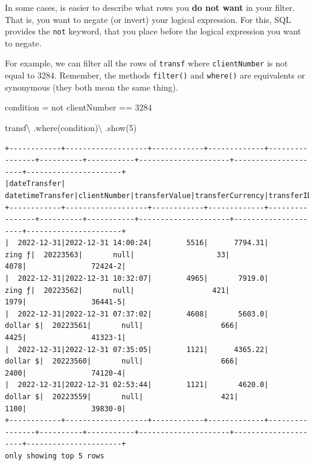 \documentclass[
  11pt,
  letterpaper,
  DIV=11,
  numbers=noendperiod]{scrreprt}
\newenvironment{Shaded}{\begin{snugshade}}{\end{snugshade}}
\newcommand{\DecValTok}[1]{\textcolor[rgb]{0.68,0.00,0.00}{#1}}
\newcommand{\NormalTok}[1]{\textcolor[rgb]{0.00,0.23,0.31}{#1}}
\newcommand{\OperatorTok}[1]{\textcolor[rgb]{0.37,0.37,0.37}{#1}}
\newcommand{\StringTok}[1]{\textcolor[rgb]{0.13,0.47,0.30}{#1}}
\begin{document}
In some cases, is easier to describe what rows you \textbf{do not want}
in your filter. That is, you want to negate (or invert) your logical
expression. For this, SQL provides the \texttt{not} keyword, that you
place before the logical expression you want to negate.

For example, we can filter all the rows of \texttt{transf} where
\texttt{clientNumber} is not equal to 3284. Remember, the methods
\texttt{filter()} and \texttt{where()} are equivalents or synonymous
(they both mean the same thing).

\begin{Shaded}
\begin{Highlighting}[]
\NormalTok{condition }\OperatorTok{=} \StringTok{\textquotesingle{}\textquotesingle{}\textquotesingle{}}
\StringTok{  not clientNumber == 3284}
\StringTok{\textquotesingle{}\textquotesingle{}\textquotesingle{}}

\NormalTok{transf}\OperatorTok{\textbackslash{}}
\NormalTok{  .where(condition)}\OperatorTok{\textbackslash{}}
\NormalTok{  .show(}\DecValTok{5}\NormalTok{)}
\end{Highlighting}
\end{Shaded}

\begin{verbatim}
+------------+-------------------+------------+-------------+----------------+----------+-----------+---------------------+---------------------+----------------------+
|dateTransfer|   datetimeTransfer|clientNumber|transferValue|transferCurrency|transferID|transferLog|destinationBankNumber|destinationBankBranch|destinationBankAccount|
+------------+-------------------+------------+-------------+----------------+----------+-----------+---------------------+---------------------+----------------------+
|  2022-12-31|2022-12-31 14:00:24|        5516|      7794.31|          zing ƒ|  20223563|       null|                   33|                 4078|               72424-2|
|  2022-12-31|2022-12-31 10:32:07|        4965|       7919.0|          zing ƒ|  20223562|       null|                  421|                 1979|               36441-5|
|  2022-12-31|2022-12-31 07:37:02|        4608|       5603.0|        dollar $|  20223561|       null|                  666|                 4425|               41323-1|
|  2022-12-31|2022-12-31 07:35:05|        1121|      4365.22|        dollar $|  20223560|       null|                  666|                 2400|               74120-4|
|  2022-12-31|2022-12-31 02:53:44|        1121|       4620.0|        dollar $|  20223559|       null|                  421|                 1100|               39830-0|
+------------+-------------------+------------+-------------+----------------+----------+-----------+---------------------+---------------------+----------------------+
only showing top 5 rows
\end{verbatim}
\end{document}
